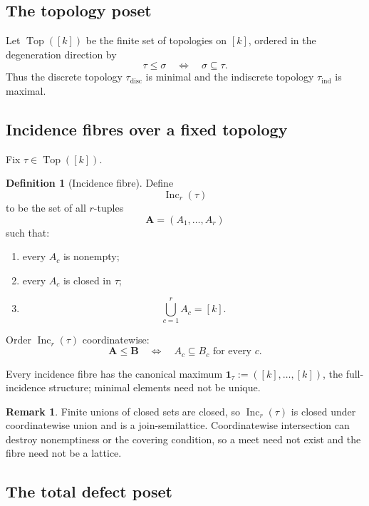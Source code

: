 \documentclass[11pt]{article}
\theoremstyle{plain}
\theoremstyle{definition}
\newtheorem{definition}[theorem]{Definition}
\newtheorem{remark}[theorem]{Remark}
\begin{document}
\subsection{The topology poset}
\label{subsec:topology-poset}

Let $\operatorname{Top}([k])$ be the finite set of topologies on $[k]$, ordered
in the degeneration direction by
\[
\tau\leq\sigma\quad\Longleftrightarrow\quad\sigma\subseteq\tau.
\]
Thus the discrete topology $\tau_{\mathrm{disc}}$ is minimal and the indiscrete topology
$\tau_{\mathrm{ind}}$ is maximal.

\subsection{Incidence fibres over a fixed topology}
\label{subsec:incidence-fibre-fixed-topology}

Fix $\tau\in\operatorname{Top}([k])$.

\begin{definition}[Incidence fibre]
\label{def:incidence-fibre}
Define
\[
\operatorname{Inc}_r(\tau)
\]
to be the set of all $r$-tuples
\[
\mathbf A
=
(A_1,\ldots,A_r)
\]
such that:
\begin{enumerate}[label=(\roman*)]
\item every $A_c$ is nonempty;
\item every $A_c$ is closed in $\tau$;
\item
\[
\bigcup_{c=1}^rA_c=[k].
\]
\end{enumerate}

Order $\operatorname{Inc}_r(\tau)$ coordinatewise:
\[
\mathbf A\leq\mathbf B
\quad\Longleftrightarrow\quad
A_c\subseteq B_c
\text{ for every }c.
\]
\end{definition}


Every incidence fibre has the canonical maximum
$\mathbf1_\tau:=([k],\ldots,[k])$, the full-incidence structure; minimal elements need
not be unique.

\begin{remark}
Finite unions of closed sets are closed, so $\operatorname{Inc}_r(\tau)$ is closed under coordinatewise union and is a join-semilattice.  Coordinatewise intersection can destroy nonemptiness or the covering condition, so a meet need not exist and the fibre need not be a lattice.
\end{remark}

\subsection{The total defect poset}
\label{subsec:total-defect-poset}
\end{document}
